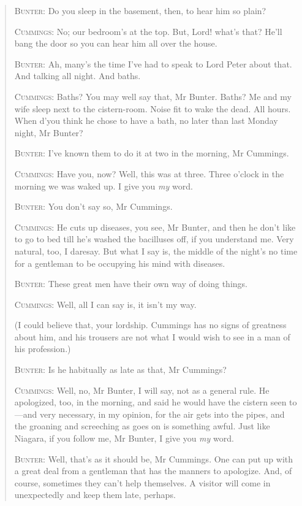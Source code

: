 \begin{quotation}
\textsc{Bunter}: Do you sleep in the basement, then, to hear him so plain?

\textsc{Cummings}: No; our bedroom’s at the top. But, Lord! what’s that? He’ll bang the door so you can hear him all over the house.

\textsc{Bunter}: Ah, many’s the time I’ve had to speak to Lord Peter about that. And talking all night. And baths.

\textsc{Cummings}: Baths? You may well say that, Mr Bunter. Baths? Me and my wife sleep next to the cistern-room. Noise fit to wake the dead. All hours. When d’you think he chose to have a bath, no later than last Monday night, Mr Bunter?

\textsc{Bunter}: I’ve known them to do it at two in the morning, Mr Cummings.

\textsc{Cummings}: Have you, now? Well, this was at three. Three o’clock in the morning we was waked up. I give you \textit{my} word.

\textsc{Bunter}: You don’t say so, Mr Cummings.

\textsc{Cummings}: He cuts up diseases, you see, Mr Bunter, and then he don’t like to go to bed till he’s washed the bacilluses off, if you understand me. Very natural, too, I daresay. But what I say is, the middle of the night’s no time for a gentleman to be occupying his mind with diseases.

\textsc{Bunter}: These great men have their own way of doing things.

\textsc{Cummings}: Well, all I can say is, it isn’t my way.

(I could believe that, your lordship. Cummings has no signs of greatness about him, and his trousers are not what I would wish to see in a man of his profession.)

\textsc{Bunter}: Is he habitually as late as that, Mr Cummings?

\textsc{Cummings}: Well, no, Mr Bunter, I will say, not as a general rule. He apologized, too, in the morning, and said he would have the cistern seen to\allowbreak---\allowbreak and very necessary, in my opinion, for the air gets into the pipes, and the groaning and screeching as goes on is something awful. Just like Niagara, if you follow me, Mr Bunter, I give you \textit{my} word.

\textsc{Bunter}: Well, that’s as it should be, Mr Cummings. One can put up with a great deal from a gentleman that has the manners to apologize. And, of course, sometimes they can’t help themselves. A visitor will come in unexpectedly and keep them late, perhaps.


\end{quotation}
